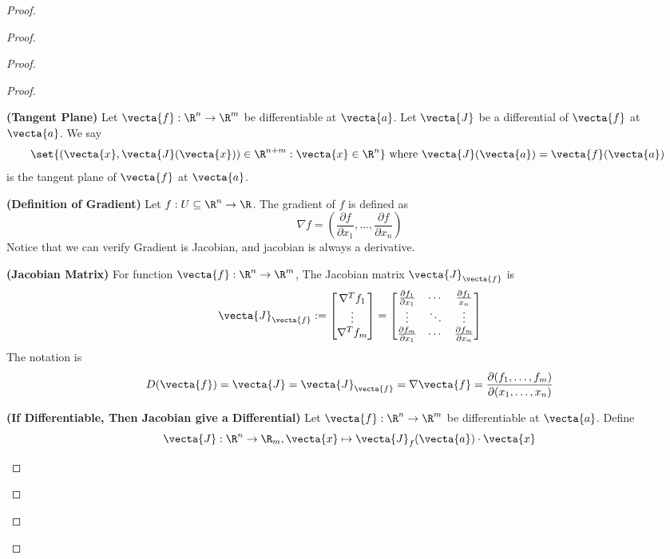\documentclass{report}
\begin{document}
\begin{proof}
\begin{proof}
\begin{proof}
\begin{proof}
\begin{definition}
\label{8.2.4}
\textbf{(Tangent Plane)} Let $\vecta{f}:\R^n\rightarrow \R^m$ be differentiable at $\vecta{a}$. Let $\vecta{J}$ be a differential of $\vecta{f}$ at $\vecta{a}$. We say
\begin{equation}
\set{(\vecta{x},\vecta{J}(\vecta{x}))\in\R^{n+m}:\vecta{x}\in\R^n}\text{ where $\vecta{J}(\vecta{a})=\vecta{f}(\vecta{a})$ }
\end{equation}
is the tangent plane of $\vecta{f}$ at $\vecta{a}$.
\end{definition}
\begin{definition}
\label{8.2.5}
\textbf{(Definition of Gradient)}  Let $f:U\subseteq \R^n \rightarrow \R$. The gradient of $f$ is defined as
\begin{equation}
  \nabla f=(\frac{\partial f}{\partial x_1},\dots ,\frac{\partial f}{\partial x_n})
\end{equation}
Notice that we can verify Gradient is Jacobian, and jacobian is always a derivative. 
\end{definition}

\begin{definition}
\label{8.2.6}
\textbf{(Jacobian Matrix)} For function $\vecta{f}:\R^n\rightarrow \R^m$, The Jacobian matrix  $\vecta{J}_\vecta{f}$ is  
\begin{equation}
  \vecta{J}_\vecta{f}:=\begin{bmatrix}
\nabla ^T f_{1}\\
\vdots\\
\nabla^T f_m
    \end{bmatrix}=\begin{bmatrix}
    \frac{\partial f_1}{\partial x_1}&\cdots & \frac{\partial f_1}{x_n}\\
    \vdots & \ddots & \vdots\\
    \frac{\partial f_m}{\partial x_1} & \cdots & \frac{\partial f_m}{\partial x_n}
    \end{bmatrix}
\end{equation}
The notation is
\begin{equation}
  D(\vecta{f})=\vecta{J}=\vecta{J}_\vecta{f}=\nabla \vecta{f}=\frac{\partial (f_1,\dots, f_m)}{\partial  (x_1,\dots,x_n)}
\end{equation}
\end{definition}

\begin{theorem}
\label{8.2.7}
\textbf{(If Differentiable, Then Jacobian give a Differential)}
Let $\vecta{f}:\R^n\rightarrow \R^m$ be differentiable at $\vecta{a}$. Define
\begin{equation}
 \vecta{J}:\R^n\rightarrow \R_m, \vecta{x}\mapsto \vecta{J}_f(\vecta{a})\cdot \vecta{x}
\end{equation}


\end{theorem}
\end{proof}
\end{proof}
\end{proof}
\end{proof}
\end{document}
